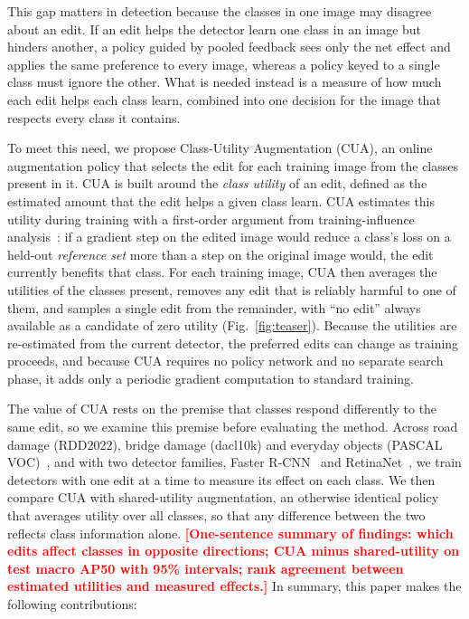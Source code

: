 \documentclass[conference]{IEEEtran}
\newcommand{\todo}[1]{\textcolor{red}{\textbf{[#1]}}}
\begin{document}
This gap matters in detection because the classes in one image may disagree about an edit. If an edit helps the detector learn one class in an image but hinders another, a policy guided by pooled feedback sees only the net effect and applies the same preference to every image, whereas a policy keyed to a single class must ignore the other. What is needed instead is a measure of how much each edit helps each class learn, combined into one decision for the image that respects every class it contains.

To meet this need, we propose Class-Utility Augmentation (CUA), an online augmentation policy that selects the edit for each training image from the classes present in it. CUA is built around the \emph{class utility} of an edit, defined as the estimated amount that the edit helps a given class learn. CUA estimates this utility during training with a first-order argument from training-influence analysis~\cite{pruthi2020tracin}: if a gradient step on the edited image would reduce a class's loss on a held-out \emph{reference set} more than a step on the original image would, the edit currently benefits that class. For each training image, CUA then averages the utilities of the classes present, removes any edit that is reliably harmful to one of them, and samples a single edit from the remainder, with ``no edit'' always available as a candidate of zero utility (Fig.~\ref{fig:teaser}). Because the utilities are re-estimated from the current detector, the preferred edits can change as training proceeds, and because CUA requires no policy network and no separate search phase, it adds only a periodic gradient computation to standard training.

The value of CUA rests on the premise that classes respond differently to the same edit, so we examine this premise before evaluating the method. Across road damage (RDD2022), bridge damage (dacl10k) and everyday objects (PASCAL VOC)~\cite{everingham2010voc}, and with two detector families, Faster R-CNN~\cite{ren2017faster} and RetinaNet~\cite{lin2017focal}, we train detectors with one edit at a time to measure its effect on each class. We then compare CUA with shared-utility augmentation, an otherwise identical policy that averages utility over all classes, so that any difference between the two reflects class information alone. \todo{One-sentence summary of findings: which edits affect classes in opposite directions; CUA minus shared-utility on test macro AP50 with 95\% intervals; rank agreement between estimated utilities and measured effects.} In summary, this paper makes the following contributions:
\end{document}
